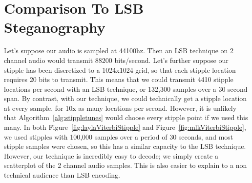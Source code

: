 \documentclass[runningheads]{llncs}
\begin{document}
\section{Comparison To LSB Steganography}
Let's suppose our audio is sampled at 44100hz.  Then an LSB technique on 2 channel audio would transmit 88200 bits/second.  Let's further suppose our stipple has been discretized to a 1024x1024 grid, so that each stipple location requires 20 bits to transmit.  This means that we could transmit 4410 stipple locations per second with an LSB technique, or 132,300 samples over a 30 second span.  By contrast, with our technique, we could technically get a stipple location at every sample, for 10x as many locations per second.  However, it is unlikely that Algorithm~\ref{alg:stippletunes} would choose every stipple point if we used this many.  In both Figure~\ref{fig:laylaViterbiStipple} and Figure~\ref{fig:mlkViterbiStipple}, we used stipples with 100,000 samples over a period of 30 seconds, and most stipple samples were chosen, so this has a similar capacity to the LSB technique.  However, our technique is incredibly easy to decode; we simply create a scatterplot of the 2 channel audio samples.  This is also easier to explain to a non technical audience than LSB encoding.








\end{document}
